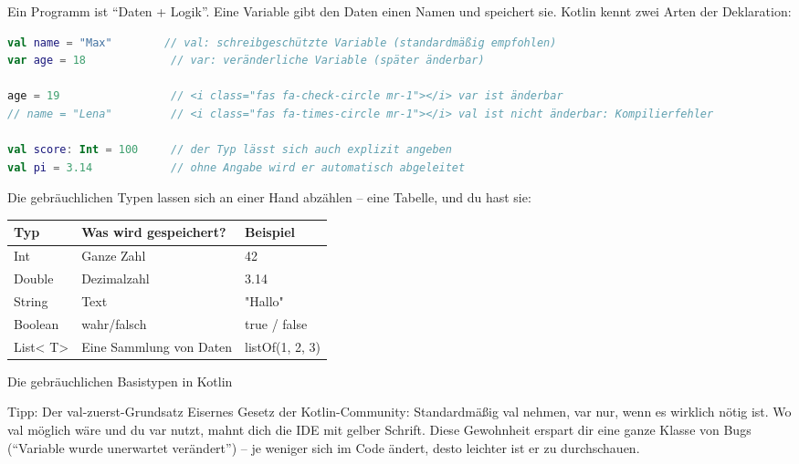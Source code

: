 


Ein Programm ist “Daten + Logik”. Eine Variable gibt den Daten einen Namen und speichert sie. Kotlin kennt zwei Arten der Deklaration:

\begin{lstlisting}[language=Kotlin]
val name = "Max"        // val: schreibgeschützte Variable (standardmäßig empfohlen)
var age = 18             // var: veränderliche Variable (später änderbar)

age = 19                 // <i class="fas fa-check-circle mr-1"></i> var ist änderbar
// name = "Lena"         // <i class="fas fa-times-circle mr-1"></i> val ist nicht änderbar: Kompilierfehler

val score: Int = 100     // der Typ lässt sich auch explizit angeben
val pi = 3.14            // ohne Angabe wird er automatisch abgeleitet
\end{lstlisting}

Die gebräuchlichen Typen lassen sich an einer Hand abzählen – eine Tabelle, und du hast sie:

\begin{center}
\begin{tabularx}{\linewidth}{|X|X|X|}
\hline
\textbf{Typ} & \textbf{Was wird gespeichert?} & \textbf{Beispiel} \tabularnewline
\hline
Int & Ganze Zahl & 42 \tabularnewline
Double & Dezimalzahl & 3.14 \tabularnewline
String & Text & "Hallo" \tabularnewline
Boolean & wahr/falsch & true / false \tabularnewline
List< T> & Eine Sammlung von Daten & listOf(1, 2, 3) \tabularnewline
\hline
\end{tabularx}
\end{center}

\begin{center}\small\color{gray}Die gebräuchlichen Basistypen in Kotlin\end{center}

\begin{tcbinfo}{Tipp: Der val-zuerst-Grundsatz}
Eisernes Gesetz der Kotlin-Community: Standardmäßig val nehmen, var nur, wenn es wirklich nötig ist. Wo val möglich wäre und du var nutzt, mahnt dich die IDE mit gelber Schrift. Diese Gewohnheit erspart dir eine ganze Klasse von Bugs (“Variable wurde unerwartet verändert”) – je weniger sich im Code ändert, desto leichter ist er zu durchschauen.

\end{tcbinfo}

